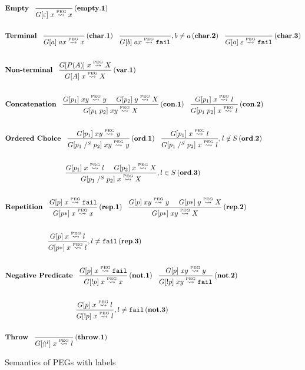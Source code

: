 \documentclass[3p,12pt,singlecolumn]{elsarticle}
\newcommand{\fivespaces}{\;\;\;\;\;}
\newcommand{\tenspaces}{\fivespaces\fivespaces}
\newcommand{\mylabel}[1]{\, \mathbf{(#1)}}
\newcommand{\Lp}{\stackrel{\mbox{\tiny{PEG}}}{\leadsto}}
\newcommand{\throw}{\Uparrow}
\begin{document}
\begin{figure}
{\small
\begin{align*}
& \textbf{Empty} \;\;\;
{\frac{}{G[\varepsilon] \; x \Lp x}} \mylabel{empty.1}
\\ \\
& \textbf{Terminal} \;\;\;
{\frac{}{G[a] \; ax \Lp x}} \mylabel{char.1}
\;\;\;
{\frac{}{G[b] \; ax \Lp {\tt fail}}}, b \ne a \mylabel{char.2}
\;\;\;
{\frac{}{G[a] \; \varepsilon \Lp {\tt fail}}} \mylabel{char.3}
\\ \\
& \textbf{Non-terminal} \;\;\;
{\frac{G[P(A)] \; x \Lp X}
      {G[A] \; x \Lp X}} \mylabel{var.1}
\\ \\
& \textbf{Concatenation} \;\;\;
{\frac{G[p_1] \; xy \Lp y \fivespaces G[p_2] \; y \Lp X}
      {G[p_1 \; p_2] \; xy \Lp X}} \mylabel{con.1}
\;\;\;
{\frac{G[p_1] \; x \Lp l}
      {G[p_1 \; p_2] \; x \Lp l}} \mylabel{con.2}
\\ \\
& \textbf{Ordered Choice} \;\;\;
{\frac{G[p_1] \; xy \Lp y}
      {G[p_1 \;\slash^S\; p_2] \; xy \Lp y}} \mylabel{ord.1}
\;\;\;
{\frac{G[p_1] \; x \Lp l}
      {G[p_1 \;\slash^S\; p_2] \; x \Lp l}}, l \not\in S \mylabel{ord.2}
\\ \\
&
\tenspaces \tenspaces \tenspaces \,
{\frac{G[p_1] \; x \Lp l \fivespaces G[p_2] \; x \Lp X}
      {G[p_1 \;\slash^S\; p_2] \; x \Lp X}}, l \in S \mylabel{ord.3}
\\ \\
& \textbf{Repetition} \;\;\;
{\frac{G[p] \; x \Lp {\tt fail}}
      {G[p*] \; x \Lp x}} \mylabel{rep.1}
\;\;\;
{\frac{G[p] \; xy \Lp y \fivespaces G[p*] \; y \Lp X}
      {G[p*] \; xy \Lp X}} \mylabel{rep.2}
\\ \\
&
\tenspaces \tenspaces \;\,
{\frac{G[p] \; x \Lp l}
      {G[p*] \; x \Lp l}}, l \neq {\tt fail} \mylabel{rep.3}
\\ \\
& \textbf{Negative Predicate} \;\;\;
{\frac{G[p] \; x \Lp {\tt fail}}
      {G[!p] \; x \Lp x}} \mylabel{not.1}
\;\;\;
{\frac{G[p] \; xy \Lp y}
      {G[!p] \; xy \Lp {\tt fail}}} \mylabel{not.2}
\\ \\
&
\tenspaces \tenspaces \tenspaces \fivespaces \;
{\frac{G[p] \; x \Lp l}
      {G[!p] \; x \Lp l}}, l \neq {\tt fail} \mylabel{not.3}
\\ \\
& \textbf{Throw} \;\;\;
{\frac{}{G[\throw^{l}] \; x \Lp l}} \mylabel{throw.1}
\end{align*}
}
\caption{Semantics of PEGs with labels}
\label{fig:sem}
\end{figure}
\end{document}
